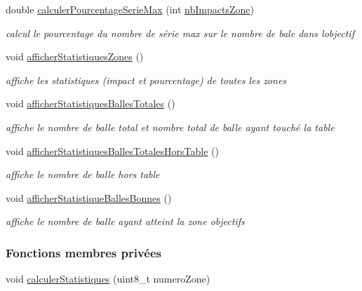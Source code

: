 \begin{DoxyCompactItemize}
double \hyperlink{class_statistiques_seance_ad042b683ce7b4db507a443b1b27bfef8}{calculer\+Pourcentage\+Serie\+Max} (int \hyperlink{class_statistiques_seance_aa4a040cda282d5b1c250025f8e191e20}{nb\+Impacts\+Zone})
\begin{DoxyCompactList}\small\item\em calcul le pourcentage du nombre de série max sur le nombre de bale dans l\textquotesingle{}objectif \end{DoxyCompactList}\item 
void \hyperlink{class_statistiques_seance_afd9087c34222c0b2c0db11c5a96459c4}{afficher\+Statistiques\+Zones} ()
\begin{DoxyCompactList}\small\item\em affiche les statistiques (impact et pourcentage) de toutes les zones \end{DoxyCompactList}\item 
void \hyperlink{class_statistiques_seance_a216b30bcfca71e425073a7ac90e59089}{afficher\+Statistiques\+Balles\+Totales} ()
\begin{DoxyCompactList}\small\item\em affiche le nombre de balle total et nombre total de balle ayant touché la table \end{DoxyCompactList}\item 
void \hyperlink{class_statistiques_seance_aebc6dad0ca5e4f99b08378077eae2c20}{afficher\+Statistiques\+Balles\+Totales\+Hors\+Table} ()
\begin{DoxyCompactList}\small\item\em affiche le nombre de balle hors table \end{DoxyCompactList}\item 
void \hyperlink{class_statistiques_seance_a712aad34b7ff7dd550ac6c976f75f416}{afficher\+Statistique\+Balles\+Bonnes} ()
\begin{DoxyCompactList}\small\item\em affiche le nombre de balle ayant atteint la zone objectifs \end{DoxyCompactList}\end{DoxyCompactItemize}
\subsubsection*{Fonctions membres privées}
\begin{DoxyCompactItemize}
\item 
void \hyperlink{class_statistiques_seance_a8bf60224113e3697adfe0a4f8f22ab7b}{calculer\+Statistiques} (uint8\+\_\+t numero\+Zone)
\end{DoxyCompactItemize}
